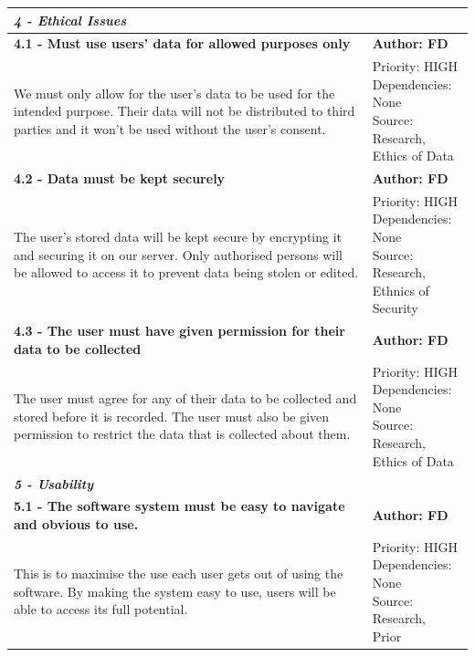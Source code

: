 \documentclass[10pt, notitlepage]{report}
\begin{document}
\begin{center}
\begin{longtable}{| p{13cm} | p{3cm} |}
\multicolumn{2}{|l|}{\textbf{\textit{4 - Ethical Issues}}} \\
\hline
\textbf{4.1 - Must use users’ data for allowed purposes only} & \textbf{Author: FD} \\
\hline
We must only allow for the user’s data to be used for the intended purpose. Their data will not be distributed to third parties and it won’t be used without the user’s consent.&
\makecell{Priority: HIGH\\Dependencies: None\\Source: Research,\\Ethics of Data}\\
\hline
\textbf{4.2 - Data must be kept securely} & \textbf{Author: FD} \\
\hline
The user’s stored data will be kept secure by encrypting it and securing it on our server. Only authorised persons will be allowed to access it to prevent data being stolen or edited.&
\makecell{Priority: HIGH\\Dependencies: None\\Source: Research,\\Ethnics of Security}\\
\hline
\textbf{4.3 - The user must have given permission for their data to be collected} & \textbf{Author: FD} \\
\hline
The user must agree for any of their data to be collected and stored before it is recorded. The user must also be given permission to restrict the data that is collected about them.&
\makecell{Priority: HIGH\\Dependencies: None\\Source: Research,\\Ethics of Data}\\
\hline

\multicolumn{2}{|l|}{\textbf{\textit{5 - Usability}}} \\
\hline
\textbf{5.1 - The software system must be easy to navigate and obvious to use.} & \textbf{Author: FD} \\
\hline
This is to maximise the use each user gets out of using the software. By making  the system easy to use, users will be able to access its full potential.&
\makecell{Priority: HIGH\\Dependencies: None\\Source: Research,\\Prior}\\
\hline


\end{longtable}
\end{center}
\end{document}
